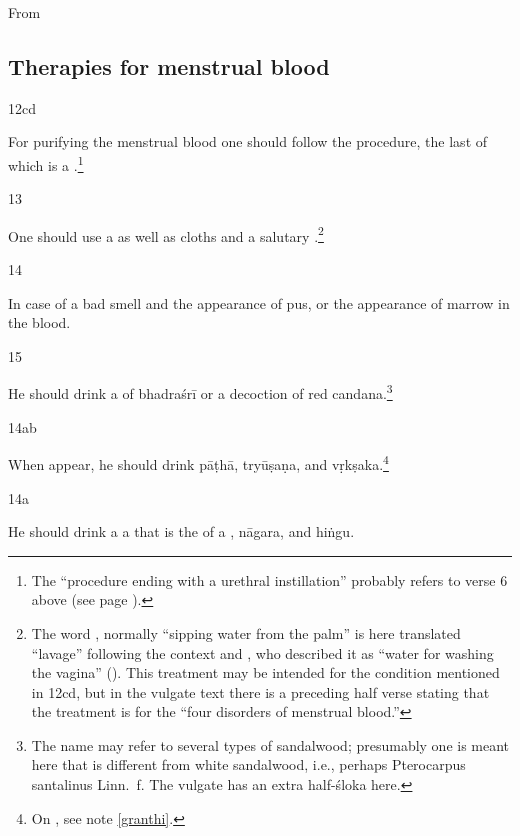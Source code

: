 \begin{translation}
\begin{sloka}
\end{sloka}

From

\subsection{Therapies for menstrual blood}

\item [12cd]

For purifying the menstrual blood one should follow the procedure, the
last of which is a .\footnote{The
    “procedure ending with a urethral instillation” probably refers to verse
    6 above (see page \pageref{uttarabastyantam}).}
    
    
 \item[13]  
 
 One should use a  as well as cloths and a salutary
.\footnote{The word , normally
    “sipping water from the palm” is here translated “lavage” following the
    context and , who described it as “water for
    washing the vagina” ().  This treatment may be
    intended for the condition mentioned in 12cd, but in the vulgate text
    there is a preceding half verse stating that the treatment is for the
    “four disorders of menstrual blood.”}
    
\item[14]

In case of a bad smell and the appearance of pus, or the appearance of
marrow in the blood.
\item [15]

He should drink a  of \gls{bhadraśrī} or a decoction of 
red \gls{candana}.\footnote{The name  may refer to several 
types of sandalwood; presumably one is meant here that is different from 
white sandalwood, i.e., perhaps Pterocarpus santalinus Linn.\ f.  The vulgate 
has an extra half-śloka here.}
 
\item[14ab]
 
 When  appear, he should drink \gls{pāṭhā}, 
 \gls{tryūṣaṇa}, and \gls{vṛkṣaka}.\footnote{On , see note 
 \ref{granthi}.}
 
 \item[14a] 
 
 He should drink a a  that is the
 of  a , \gls{nāgara},
and \gls{hiṅgu}.
 

\end{translation}
